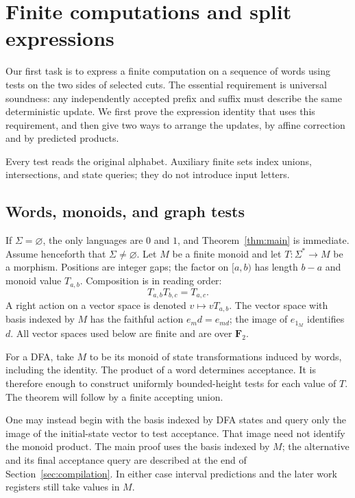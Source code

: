 \section{Finite computations and split expressions}\label{sec:algebra}

Our first task is to express a finite computation on a sequence of words
using tests on the two sides of selected cuts. The essential requirement is
universal soundness: any independently accepted prefix and suffix must describe
the same deterministic update. We first prove the expression identity that
uses this requirement, and then give two ways to arrange the updates, by
affine correction and by predicted products.

Every test reads the original alphabet. Auxiliary finite sets index unions,
intersections, and state queries; they do not introduce input letters.

\subsection{Words, monoids, and graph tests}

If \(\Sigma=\varnothing\), the only languages are \(0\) and \(1\), and
Theorem~\ref{thm:main} is immediate. Assume henceforth that \(\Sigma\ne\varnothing\).
Let \(M\) be a finite monoid and let \(T:\Sigma^*\to M\) be a morphism.
Positions are integer gaps; the factor on \([a,b)\) has length \(b-a\) and
monoid value \(T_{a,b}\). Composition is in reading order:
\[
                  T_{a,b}T_{b,c}=T_{a,c}.
\]
A right action on a vector space is denoted \(v\mapsto vT_{a,b}\).
The vector space with basis indexed by \(M\) has the faithful action
\(e_m d=e_{md}\); the image of \(e_{1_M}\) identifies \(d\).
All vector spaces used below are finite and are over \(\mathbf F_2\).

For a DFA, take \(M\) to be its monoid of state transformations induced by words,
including the identity. The product of a word determines acceptance. It is
therefore enough to construct uniformly bounded-height tests for each value of
\(T\). The theorem will follow by a finite accepting union.

\begin{remark}\label{rem:dfa-basis}
One may instead begin with the basis indexed by DFA states and query only
the image of the initial-state vector to test acceptance. That image need not
identify the monoid product. The main proof uses the basis indexed by $M$;
the alternative and its final acceptance query are described at the end
of Section~\ref{sec:compilation}. In either case interval predictions and
the later work registers still take values in $M$.
\end{remark}

